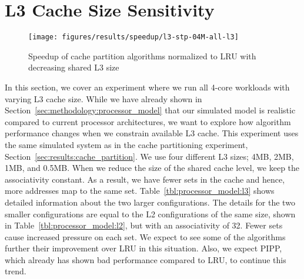 \section{L3 Cache Size Sensitivity}
\label{sec:results:l3size_sensitivity}


\begin{figure}[th]
    \centering
    \texttt{[image: figures/results/speedup/l3-stp-04M-all-l3]}
    \caption[Speedup wtih decreasing L3 size]{Speedup of cache partition algorithms normalized to LRU with decreasing shared L3 size}
    \label{fig:results:l3}
\end{figure}

In this section, we cover an experiment where we run all 4-core workloads with varying L3 cache size.
While we have already shown in Section~\ref{sec:methodology:processor_model} that our simulated model is realistic compared to current processor architectures, we want to explore how algorithm performance changes when we constrain available L3 cache.
This experiment uses the same simulated system as in the cache partitioning experiment, Section~\ref{sec:results:cache_partition}.
We use four different L3 sizes; 4MB, 2MB, 1MB, and 0.5MB.
When we reduce the size of the shared cache level, we keep the associativity constant.
As a result, we have fewer sets in the cache and hence, more addresses map to the same set.
Table~\ref{tbl:processor_model:l3} shows detailed information about the two larger configurations.
The details for the two smaller configurations are equal to the L2 configurations of the same size, shown in Table~\ref{tbl:processor_model:l2}, but with an associativity of 32.
Fewer sets cause increased pressure on each set.
We expect to see some of the algorithms further their improvement over LRU in this situation.
Also, we expect PIPP, which already has shown bad performance compared to LRU, to continue this trend.

